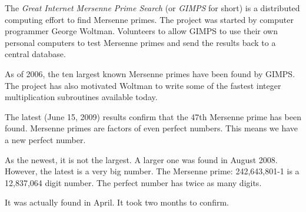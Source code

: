\documentclass[12pt]{article}
\begin{document}
The {\em Great Internet Mersenne Prime Search} (or {\em GIMPS} for short) is a distributed computing effort to find Mersenne primes. The project was started by computer programmer George Woltman. Volunteers  to allow GIMPS to use their own personal computers to test  Mersenne primes and send the results back to a central database.

As of 2006, the ten largest known Mersenne primes have been found by GIMPS. The project has also motivated Woltman to write some of the fastest integer multiplication subroutines available today.


The latest (June 15, 2009) results confirm that the 47th Mersenne prime has been found.  Mersenne primes are factors of even perfect numbers. This means we have a new perfect number. 
 
As the newest, it is not the largest. A larger one was found in August 2008. However, the latest is a very big number. The Mersenne prime: 242,643,801-1 is a 12,837,064 digit number.  The perfect number has twice as many digits.
 
It was actually found in April. It took two months to confirm.
 
 
\end{document}
